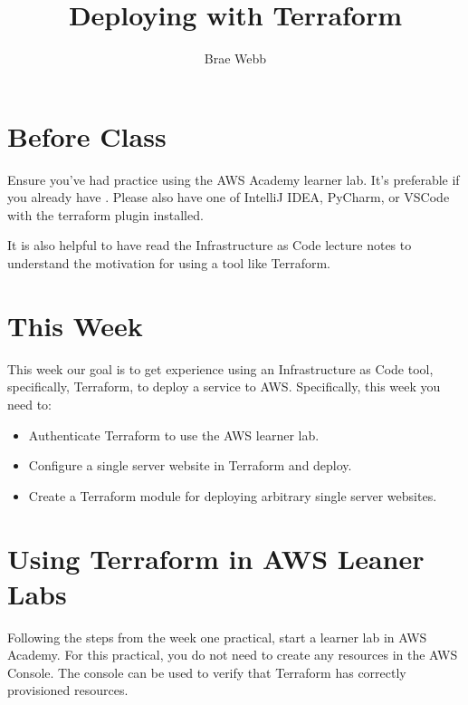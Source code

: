 \documentclass{csse4400}
\title{Deploying with Terraform}
\author{Brae Webb}
\date{\week{3}}
\begin{document}
\maketitle

\section{Before Class}
Ensure you've had practice using the AWS Academy learner lab.
It's preferable if you already have .
Please also have one of IntelliJ IDEA, PyCharm, or VSCode with the terraform plugin installed.

\noindent It is also helpful to have read the Infrastructure as Code lecture notes to understand the motivation for using a tool like Terraform.

\section{This Week}
This week our goal is to get experience using an Infrastructure as Code tool, specifically, Terraform,
to deploy a service to AWS.
Specifically, this week you need to:
\begin{itemize}
    \item Authenticate Terraform to use the AWS learner lab.
    \item Configure a single server website in Terraform and deploy.
    \item Create a Terraform module for deploying arbitrary single server websites.
\end{itemize}

\section{Using Terraform in AWS Leaner Labs}
Following the steps from the week one practical, start a learner lab in AWS Academy.
For this practical, you do not need to create any resources in the AWS Console.
The console can be used to verify that Terraform has correctly provisioned resources.
\end{document}
